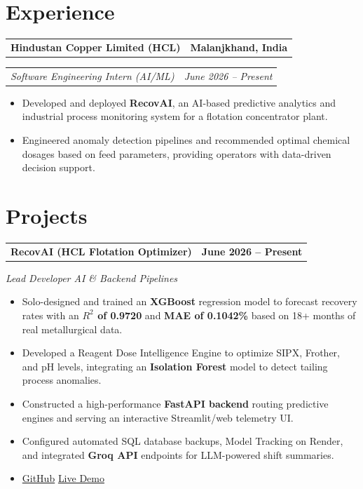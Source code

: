 \documentclass[10pt,a4paper]{article}
\makeatletter
\newcommand{\resumeHeader}[2]{%
  \noindent
  \begin{tabular*}{\textwidth}{@{}l@{\extracolsep{\fill}}r@{}}
    \textbf{#1} & \textbf{#2} \\
  \end{tabular*}%
  \vspace{-2pt}
}
\newcommand{\resumeSubheader}[2]{%
  \noindent
  \begin{tabular*}{\textwidth}{@{}l@{\extracolsep{\fill}}r@{}}
    \textit{#1} & \textit{#2} \\
  \end{tabular*}\vspace{1pt}%
}
\newcommand{\resumeProjectTitle}[2]{%
  \vspace{2pt}
  \noindent
  \begin{tabular*}{\textwidth}{@{}l@{\extracolsep{\fill}}r@{}}
    \textbf{#1} & \textbf{#2} \\
  \end{tabular*}%
  \vspace{-2pt}
}
\newcommand{\resumeProjectSubtitle}[1]{%
  \noindent\textit{#1}\vspace{1pt}%
}
\makeatother
\begin{document}
\section{Experience}

\resumeHeader{Hindustan Copper Limited (HCL)}{Malanjkhand, India}
\resumeSubheader{Software Engineering Intern (AI/ML)}{June 2026 -- Present}
\begin{itemize}
  \item Developed and deployed \textbf{RecovAI}, an AI-based predictive analytics and industrial process monitoring system for a flotation concentrator plant.
  \item Engineered anomaly detection pipelines and recommended optimal chemical dosages based on feed parameters, providing operators with data-driven decision support.
\end{itemize}

\section{Projects}

\resumeProjectTitle{RecovAI (HCL Flotation Optimizer)}{June 2026 -- Present}
\resumeProjectSubtitle{Lead Developer \textperiodcentered{} AI \& Backend Pipelines}
\begin{itemize}
  \item Solo-designed and trained an \textbf{XGBoost} regression model to forecast recovery rates with an \textbf{$R^2$ of 0.9720} and \textbf{MAE of 0.1042\%} based on 18+ months of real metallurgical data.
  \item Developed a Reagent Dose Intelligence Engine to optimize SIPX, Frother, and pH levels, integrating an \textbf{Isolation Forest} model to detect tailing process anomalies.
  \item Constructed a high-performance \textbf{FastAPI backend} routing predictive engines and serving an interactive Streamlit/web telemetry UI.
  \item Configured automated SQL database backups, Model Tracking on Render, and integrated \textbf{Groq API} endpoints for LLM-powered shift summaries.
  \item \href{https://github.com/dikshadamahe/RecovAI}{GitHub} \textbar{} \href{https://recovai-xys2.onrender.com}{Live Demo}
\end{itemize}
\end{document}
